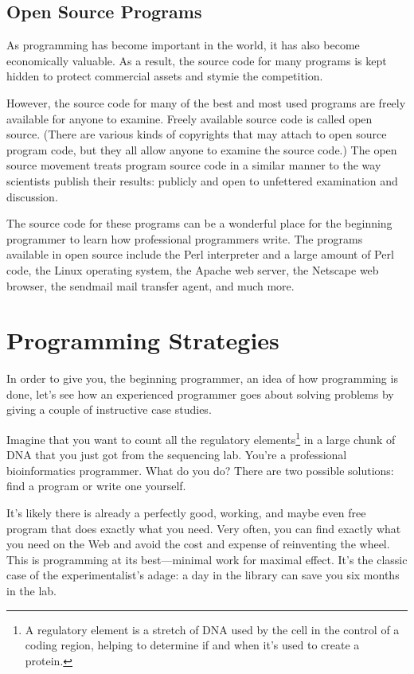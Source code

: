 \subsection{Open Source Programs}
As programming has become important in the world, it has also become economically valuable. As a result, the source code for many programs is kept hidden to protect commercial assets and stymie the competition.

However, the source code for many of the best and most used programs are freely available for anyone to examine. Freely available source code is called open source. (There are various kinds of copyrights that may attach to open source program code, but they all allow anyone to examine the source code.) The open source movement treats program source code in a similar manner to the way scientists publish their results: publicly and open to unfettered examination and discussion.

The source code for these programs can be a wonderful place for the beginning programmer to learn how professional programmers write. The programs available in open source include the Perl interpreter and a large amount of Perl code, the Linux operating system, the Apache web server, the Netscape web browser, the sendmail mail transfer agent, and much more. 

\section{Programming Strategies}
In order to give you, the beginning programmer, an idea of how programming is done, let's see how an experienced programmer goes about solving problems by giving a couple of instructive case studies.

Imagine that you want to count all the regulatory elements\footnote{A regulatory element is a stretch of DNA used by the cell in the control of a coding region, helping to determine if and when it's used to create a protein.} in a large chunk of DNA that you just got from the sequencing lab. You're a professional bioinformatics programmer. What do you do? There are two possible solutions: find a program or write one yourself.

It's likely there is already a perfectly good, working, and maybe even free program that does exactly what you need. Very often, you can find exactly what you need on the Web and avoid the cost and expense of reinventing the wheel. This is programming at its best—minimal work for maximal effect. It's the classic case of the experimentalist's adage: a day in the library can save you six months in the lab.

